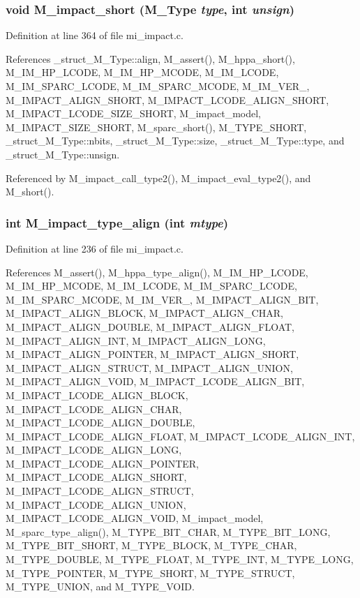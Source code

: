 \subsubsection{\setlength{\rightskip}{0pt plus 5cm}void M\_\-impact\_\-short (\bf{M\_\-Type} {\em type}, int {\em unsign})}\label{mi__impact_8c_a94b5d5462bdc58c2bd5e481fb206674}




Definition at line 364 of file mi\_\-impact.c.

References \_\-struct\_\-M\_\-Type::align, M\_\-assert(), M\_\-hppa\_\-short(), M\_\-IM\_\-HP\_\-LCODE, M\_\-IM\_\-HP\_\-MCODE, M\_\-IM\_\-LCODE, M\_\-IM\_\-SPARC\_\-LCODE, M\_\-IM\_\-SPARC\_\-MCODE, M\_\-IM\_\-VER\_, M\_\-IMPACT\_\-ALIGN\_\-SHORT, M\_\-IMPACT\_\-LCODE\_\-ALIGN\_\-SHORT, M\_\-IMPACT\_\-LCODE\_\-SIZE\_\-SHORT, M\_\-impact\_\-model, M\_\-IMPACT\_\-SIZE\_\-SHORT, M\_\-sparc\_\-short(), M\_\-TYPE\_\-SHORT, \_\-struct\_\-M\_\-Type::nbits, \_\-struct\_\-M\_\-Type::size, \_\-struct\_\-M\_\-Type::type, and \_\-struct\_\-M\_\-Type::unsign.

Referenced by M\_\-impact\_\-call\_\-type2(), M\_\-impact\_\-eval\_\-type2(), and M\_\-short().
\subsubsection{\setlength{\rightskip}{0pt plus 5cm}int M\_\-impact\_\-type\_\-align (int {\em mtype})}\label{mi__impact_8c_e84f3c6ef3e27221d95a0e75a58f7710}




Definition at line 236 of file mi\_\-impact.c.

References M\_\-assert(), M\_\-hppa\_\-type\_\-align(), M\_\-IM\_\-HP\_\-LCODE, M\_\-IM\_\-HP\_\-MCODE, M\_\-IM\_\-LCODE, M\_\-IM\_\-SPARC\_\-LCODE, M\_\-IM\_\-SPARC\_\-MCODE, M\_\-IM\_\-VER\_, M\_\-IMPACT\_\-ALIGN\_\-BIT, M\_\-IMPACT\_\-ALIGN\_\-BLOCK, M\_\-IMPACT\_\-ALIGN\_\-CHAR, M\_\-IMPACT\_\-ALIGN\_\-DOUBLE, M\_\-IMPACT\_\-ALIGN\_\-FLOAT, M\_\-IMPACT\_\-ALIGN\_\-INT, M\_\-IMPACT\_\-ALIGN\_\-LONG, M\_\-IMPACT\_\-ALIGN\_\-POINTER, M\_\-IMPACT\_\-ALIGN\_\-SHORT, M\_\-IMPACT\_\-ALIGN\_\-STRUCT, M\_\-IMPACT\_\-ALIGN\_\-UNION, M\_\-IMPACT\_\-ALIGN\_\-VOID, M\_\-IMPACT\_\-LCODE\_\-ALIGN\_\-BIT, M\_\-IMPACT\_\-LCODE\_\-ALIGN\_\-BLOCK, M\_\-IMPACT\_\-LCODE\_\-ALIGN\_\-CHAR, M\_\-IMPACT\_\-LCODE\_\-ALIGN\_\-DOUBLE, M\_\-IMPACT\_\-LCODE\_\-ALIGN\_\-FLOAT, M\_\-IMPACT\_\-LCODE\_\-ALIGN\_\-INT, M\_\-IMPACT\_\-LCODE\_\-ALIGN\_\-LONG, M\_\-IMPACT\_\-LCODE\_\-ALIGN\_\-POINTER, M\_\-IMPACT\_\-LCODE\_\-ALIGN\_\-SHORT, M\_\-IMPACT\_\-LCODE\_\-ALIGN\_\-STRUCT, M\_\-IMPACT\_\-LCODE\_\-ALIGN\_\-UNION, M\_\-IMPACT\_\-LCODE\_\-ALIGN\_\-VOID, M\_\-impact\_\-model, M\_\-sparc\_\-type\_\-align(), M\_\-TYPE\_\-BIT\_\-CHAR, M\_\-TYPE\_\-BIT\_\-LONG, M\_\-TYPE\_\-BIT\_\-SHORT, M\_\-TYPE\_\-BLOCK, M\_\-TYPE\_\-CHAR, M\_\-TYPE\_\-DOUBLE, M\_\-TYPE\_\-FLOAT, M\_\-TYPE\_\-INT, M\_\-TYPE\_\-LONG, M\_\-TYPE\_\-POINTER, M\_\-TYPE\_\-SHORT, M\_\-TYPE\_\-STRUCT, M\_\-TYPE\_\-UNION, and M\_\-TYPE\_\-VOID.

